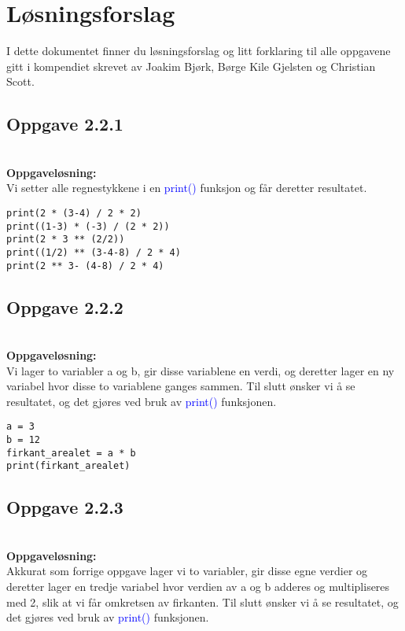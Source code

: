 \section{Løsningsforslag}
I dette dokumentet finner du løsningsforslag og litt forklaring til alle oppgavene gitt i kompendiet skrevet av Joakim Bjørk, Børge Kile Gjelsten og Christian Scott.

\subsection{Oppgave 2.2.1}
\\

\textbf{Oppgaveløsning:}\\
Vi setter alle regnestykkene i en {\ttfamily\textcolor{blue}{print()}} funksjon og får deretter resultatet.

\begin{lstlisting}
print(2 * (3-4) / 2 * 2)
print((1-3) * (-3) / (2 * 2))
print(2 * 3 ** (2/2))
print((1/2) ** (3-4-8) / 2 * 4)
print(2 ** 3- (4-8) / 2 * 4)
\end{lstlisting}

\subsection{Oppgave 2.2.2}
\\

\textbf{Oppgaveløsning:}\\
Vi lager to variabler {\ttfamily a} og {\ttfamily b}, gir disse variablene en verdi, og deretter lager en ny variabel hvor disse to variablene ganges sammen. Til slutt ønsker vi å se resultatet, og det gjøres ved bruk av {\ttfamily\textcolor{blue}{print()}} funksjonen.

\begin{lstlisting}
a = 3
b = 12
firkant_arealet = a * b 
print(firkant_arealet)
\end{lstlisting}

\subsection{Oppgave 2.2.3}
\\

\textbf{Oppgaveløsning:}\\
Akkurat som forrige oppgave lager vi to variabler, gir disse egne verdier og deretter lager en tredje variabel hvor verdien av {\ttfamily a} og {\ttfamily b} adderes og multipliseres med 2, slik at vi får omkretsen av firkanten. Til slutt ønsker vi å se resultatet, og det gjøres ved bruk av {\ttfamily\textcolor{blue}{print()}} funksjonen.

